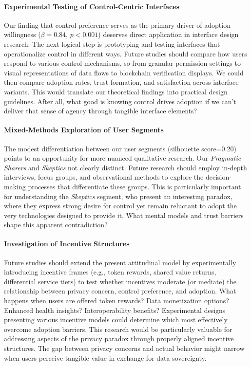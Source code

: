 	\paragraph{Experimental Testing of Control-Centric Interfaces}
	Our finding that control preference serves as the primary driver of adoption willingness ($\beta=0.84$, $p<0.001$) deserves direct application in interface design research. The next logical step is prototyping and testing interfaces that operationalize control in different ways. Future studies should compare how users respond to various control mechanisms, so from granular permission settings to visual representations of data flows to blockchain verification displays. We could then compare adoption rates, trust formation, and satisfaction across interface variants. This would translate our theoretical findings into practical design guidelines. After all, what good is knowing control drives adoption if we can't deliver that sense of agency through tangible interface elements?
	
	\paragraph{Mixed-Methods Exploration of User Segments}
	The modest differentiation between our user segments (silhouette score=0.20) points to an opportunity for more nuanced qualitative research. Our \textit{Pragmatic Sharers} and \textit{Skeptics} not clearly distinct. Future research should employ in-depth interviews, focus groups, and observational methods to explore the decision-making processes that differentiate these groups. This is particularly important for understanding the \textit{Skeptics} segment, who present an interesting paradox, where they express strong desire for control yet remain reluctant to adopt the very technologies designed to provide it. What mental models and trust barriers shape this apparent contradiction?
	
	\paragraph{Investigation of Incentive Structures}
	Future studies should extend the present attitudinal model by experimentally introducing incentive frames (e.g., token rewards, shared value returns, differential service tiers) to test whether incentives moderate (or mediate) the relationship between privacy concern, control preference, and adoption. What happens when users are offered token rewards? Data monetization options? Enhanced health insights? Interoperability benefits? Experimental designs presenting various incentive models could determine which most effectively overcome adoption barriers. This research would be particularly valuable for addressing aspects of the privacy paradox through properly aligned incentive structures. The gap between privacy concerns and actual behavior might narrow when users perceive tangible value in exchange for data sovereignty.
	
